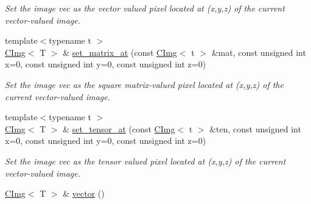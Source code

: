 \begin{DoxyCompactItemize}
\begin{DoxyCompactList}\small\item\em Set the image {\ttfamily vec} as the {\itshape vector\/} {\itshape valued\/} pixel located at ({\ttfamily x},{\ttfamily y},{\ttfamily z}) of the current vector-\/valued image. \item\end{DoxyCompactList}\item 
\hypertarget{structcimg__library_1_1CImg_ae0e585d6280147aabd19c398819040d9}{
{\footnotesize template$<$typename t $>$ }\\\hyperlink{structcimg__library_1_1CImg}{CImg}$<$ T $>$ \& \hyperlink{structcimg__library_1_1CImg_ae0e585d6280147aabd19c398819040d9}{set\_\-matrix\_\-at} (const \hyperlink{structcimg__library_1_1CImg}{CImg}$<$ t $>$ \&mat, const unsigned int x=0, const unsigned int y=0, const unsigned int z=0)}
\label{structcimg__library_1_1CImg_ae0e585d6280147aabd19c398819040d9}

\begin{DoxyCompactList}\small\item\em Set the image {\ttfamily vec} as the {\itshape square\/} {\itshape matrix-\/valued\/} pixel located at ({\ttfamily x},{\ttfamily y},{\ttfamily z}) of the current vector-\/valued image. \item\end{DoxyCompactList}\item 
\hypertarget{structcimg__library_1_1CImg_af390fdfa10bc133864a83b101d934284}{
{\footnotesize template$<$typename t $>$ }\\\hyperlink{structcimg__library_1_1CImg}{CImg}$<$ T $>$ \& \hyperlink{structcimg__library_1_1CImg_af390fdfa10bc133864a83b101d934284}{set\_\-tensor\_\-at} (const \hyperlink{structcimg__library_1_1CImg}{CImg}$<$ t $>$ \&ten, const unsigned int x=0, const unsigned int y=0, const unsigned int z=0)}
\label{structcimg__library_1_1CImg_af390fdfa10bc133864a83b101d934284}

\begin{DoxyCompactList}\small\item\em Set the image {\ttfamily vec} as the {\itshape tensor\/} {\itshape valued\/} pixel located at ({\ttfamily x},{\ttfamily y},{\ttfamily z}) of the current vector-\/valued image. \item\end{DoxyCompactList}\item 
\hypertarget{structcimg__library_1_1CImg_a7a1fbbf9bb23d01f64a8ca3bd06b7c0f}{
\hyperlink{structcimg__library_1_1CImg}{CImg}$<$ T $>$ \& \hyperlink{structcimg__library_1_1CImg_a7a1fbbf9bb23d01f64a8ca3bd06b7c0f}{vector} ()}
\label{structcimg__library_1_1CImg_a7a1fbbf9bb23d01f64a8ca3bd06b7c0f}


\end{DoxyCompactItemize}
